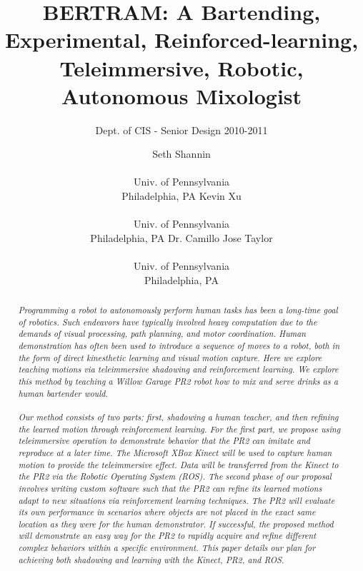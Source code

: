 \documentclass{sig-alternate}
\begin{document}
 

\title{BERTRAM: A Bartending, Experimental, Reinforced-learning, Teleimmersive, Robotic, Autonomous Mixologist}

\subtitle{Dept. of CIS - Senior Design 2010-2011}
\author{
\alignauthor Seth Shannin \\  \\ Univ. of Pennsylvania \\ Philadelphia, PA
\alignauthor Kevin Xu \\  \\ Univ. of Pennsylvania \\ Philadelphia, PA
\alignauthor Dr. Camillo Jose Taylor \\  \\ Univ. of Pennsylvania \\ Philadelphia, PA}
\date{}
\maketitle

\begin{abstract}
\textit{Programming a robot to autonomously perform human tasks has been a long-time goal of robotics. Such endeavors have typically involved heavy computation due to the demands of visual processing, path planning, and motor coordination. Human demonstration has often been used to introduce a sequence of moves to a robot, both in the form of direct kinesthetic learning and visual motion capture. 
Here we explore teaching motions via teleimmersive shadowing and reinforcement
learning. We explore this method by teaching a Willow Garage PR2 robot how to
mix and serve drinks as a human bartender would.
\\
\\Our method consists of two parts: first, shadowing a human teacher, and then refining the learned motion through reinforcement learning. For the first part, we propose using teleimmersive operation to demonstrate behavior that the PR2 can imitate and reproduce at a later time. The Microsoft XBox Kinect will be used to capture human motion to provide the teleimmersive effect. Data will be transferred from the Kinect to the PR2 via the Robotic Operating System (ROS). The second phase of our proposal involves writing custom software such that the PR2 can refine its learned motions adapt to new situations via reinforcement learning techniques. The PR2 will evaluate its own performance in scenarios where objects are not placed in the exact same location as they were for the human demonstrator. If successful, the proposed method will demonstrate an easy way for the PR2 to rapidly acquire and refine different complex behaviors within a specific environment. This paper details our plan for achieving both shadowing and learning with the Kinect, PR2, and ROS.}
\end{abstract}
\end{document}
